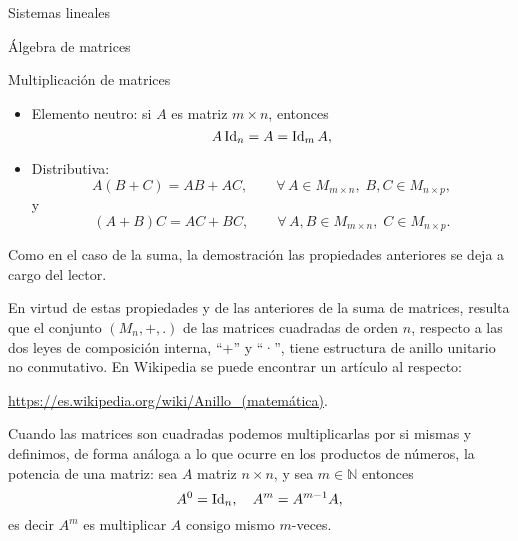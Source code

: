 \begin{chapter}{Sistemas lineales}
\begin{section}{\'Algebra de matrices}
\begin{subsection}{Multiplicaci\'on de matrices}
\begin{itemize}
                    \item Elemento neutro: si  $A$ es matriz $m \times n$,  entonces
                    \begin{equation*}
                    A\operatorname{Id}_{n} = A = \operatorname{Id}_{m}A,
                    \end{equation*}
                    \item Distributiva:
                    \begin{equation*}
                    A(B + C) = AB + AC,\qquad \forall\, A \in M_{m \times n}, \;B, C \in M_{n \times p},
                    \end{equation*}
                    y
                    \begin{equation*}
                    (A+ B)C = AC + BC,\qquad \forall\, A, B \in M_{m \times n}, \; C \in M_{n \times p}.
                    \end{equation*}
                \end{itemize}	
                
                Como en el caso de la suma,  la demostración las propiedades anteriores se deja a cargo del lector. 
                
                En virtud de estas propiedades y de las anteriores de la suma de matrices, resulta que el conjunto $(M_n ,+,.)$  de las matrices cuadradas de orden $n$, respecto a las dos leyes de composición interna, ``+'' y ``·'', tiene estructura de anillo unitario no conmutativo. En Wikipedia se puede encontrar un artículo al respecto:
                \begin{center}
                    \href{ https://es.wikipedia.org/wiki/Anillo\_(matemática)}{ https://es.wikipedia.org/wiki/Anillo\_(matemática)}.     
                \end{center}
                
                Cuando las matrices son cuadradas podemos multiplicarlas por si mismas y  definimos,  de forma análoga a lo que ocurre en los productos de números, la potencia de una matriz: sea $A$ matriz $n \times n$, y sea $m \in \mathbb N$ entonces
                \begin{equation*}
                A^0 = \operatorname{Id}_{n}, \quad A^m = A^{m-1}A,		
                \end{equation*}
                es decir $A^m$ es multiplicar $A$ consigo mismo $m$-veces.  
                

\end{subsection}
\end{section}
\end{chapter}
